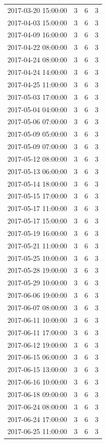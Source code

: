 \begin{tabular}{lrrr}
2017-03-20 15:00:00 & 3 & 6 & 3 \\
2017-04-03 15:00:00 & 3 & 6 & 3 \\
2017-04-09 16:00:00 & 3 & 6 & 3 \\
2017-04-22 08:00:00 & 3 & 6 & 3 \\
2017-04-24 08:00:00 & 3 & 6 & 3 \\
2017-04-24 14:00:00 & 3 & 6 & 3 \\
2017-04-25 11:00:00 & 3 & 6 & 3 \\
2017-05-03 17:00:00 & 3 & 6 & 3 \\
2017-05-04 04:00:00 & 3 & 6 & 3 \\
2017-05-06 07:00:00 & 3 & 6 & 3 \\
2017-05-09 05:00:00 & 3 & 6 & 3 \\
2017-05-09 07:00:00 & 3 & 6 & 3 \\
2017-05-12 08:00:00 & 3 & 6 & 3 \\
2017-05-13 06:00:00 & 3 & 6 & 3 \\
2017-05-14 18:00:00 & 3 & 6 & 3 \\
2017-05-15 17:00:00 & 3 & 6 & 3 \\
2017-05-17 11:00:00 & 3 & 6 & 3 \\
2017-05-17 15:00:00 & 3 & 6 & 3 \\
2017-05-19 16:00:00 & 3 & 6 & 3 \\
2017-05-21 11:00:00 & 3 & 6 & 3 \\
2017-05-25 10:00:00 & 3 & 6 & 3 \\
2017-05-28 19:00:00 & 3 & 6 & 3 \\
2017-05-29 10:00:00 & 3 & 6 & 3 \\
2017-06-06 19:00:00 & 3 & 6 & 3 \\
2017-06-07 08:00:00 & 3 & 6 & 3 \\
2017-06-11 10:00:00 & 3 & 6 & 3 \\
2017-06-11 17:00:00 & 3 & 6 & 3 \\
2017-06-12 19:00:00 & 3 & 6 & 3 \\
2017-06-15 06:00:00 & 3 & 6 & 3 \\
2017-06-15 13:00:00 & 3 & 6 & 3 \\
2017-06-16 10:00:00 & 3 & 6 & 3 \\
2017-06-18 09:00:00 & 3 & 6 & 3 \\
2017-06-24 08:00:00 & 3 & 6 & 3 \\
2017-06-24 17:00:00 & 3 & 6 & 3 \\
2017-06-25 11:00:00 & 3 & 6 & 3 \\

\end{tabular}
